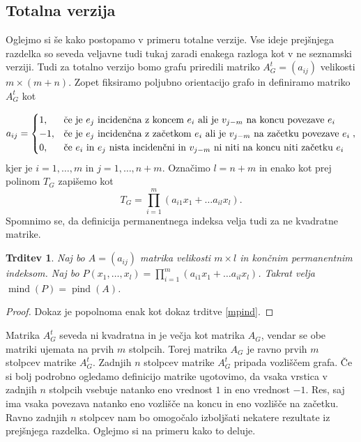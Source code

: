 \documentclass[12pt,a4paper,twoside]{article}
\theoremstyle{definition} %
\theoremstyle{plain} %
\newtheorem{trditev}[definicija]{Trditev}
\numberwithin{equation}{section}  %
\DeclareMathOperator{\mind}{mind}
\DeclareMathOperator{\pind}{pind}
\begin{document}
\subsection{Totalna verzija}
Oglejmo si še kako postopamo v primeru totalne verzije. Vse ideje prejšnjega razdelka so seveda veljavne tudi tukaj zaradi enakega razloga kot v ne seznamski verziji. Tudi za totalno verzijo bomo grafu priredili matriko $A_G^t = (a_{ij})$ velikosti $m \times (m+n)$. Zopet fiksiramo poljubno orientacijo grafo in definiramo matriko $A_G^t$ kot

\begin{equation*}
a_{ij} = 
\begin{cases}

1, & \text{če je $e_j$ incidenčna z koncem $e_i$ ali je $v_{j-m}$ na koncu povezave $e_i$}\\ 
	-1, & \text{če je $ e_j$ incidenčna z začetkom  $e_i$ ali je $v_{j-m}$ na začetku povezave $e_i$} \\

0, & \text{če $e_i$ in $e_j$ nista incidenčni in $v_{j-m}$ ni niti na koncu niti začetku $e_i$}
\end{cases},
\end{equation*}
kjer je $i=1,\ldots, m$ in $j=1, \ldots, n+m$. Označimo $l=n+m$ in enako kot prej  polinom $T_G$ zapišemo kot 
$$T_G = \prod_{i=1}^m (a_{i1}x_1 + \ldots a_{il}x_l).$$
Spomnimo se, da definicija permanentnega indeksa velja tudi za ne kvadratne matrike.
\begin{trditev}
Naj bo $A = (a_{ij})$  matrika velikosti $m \times l$ in končnim permanentnim indeksom. Naj bo $P(x_1, \ldots, x_l) = \prod_{i=1}^m (a_{i1}x_1 + \ldots a_{il}x_l)$. Takrat velja $\mind(P) = \pind(A)$.
\end{trditev}
\begin{proof}
Dokaz je popolnoma enak kot dokaz trditve \ref{mpind}.
\end{proof}
Matrika $A_G^t$ seveda ni kvadratna in je večja kot matrika $A_G$, vendar se obe matriki ujemata na prvih $m$ stolpcih. Torej matrika $A_G$ je ravno prvih $m$ stolpcev matrike $A_G^t$. Zadnjih $n$ stolpcev matrike $A_G^t$ pripada vozliščem grafa. Če si bolj podrobno ogledamo definicijo matrike ugotovimo, da vsaka vrstica v zadnjih $n$ stolpcih vsebuje natanko eno vrednost $1$ in eno vrednost $-1$. Res, saj ima vsaka povezava natanko eno vozlišče na koncu in eno vozlišče na začetku. Ravno zadnjih $n$ stolpcev nam bo omogočalo izboljšati nekatere rezultate iz prejšnjega razdelka. Oglejmo si na primeru kako to deluje.
\end{document}
